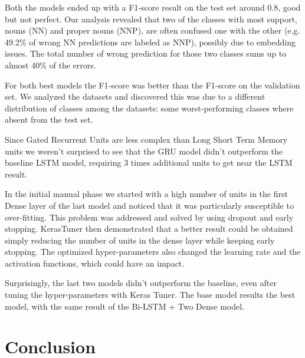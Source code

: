 \documentclass[11pt]{article}
\begin{document}

Both the models ended up with a F1-score result on the test set around 0.8, good but not perfect. Our analysis revealed that two of the classes with most support, nouns (NN) and proper nouns (NNP), are often confused one with the other (e.g. 49.2\% of wrong NN predictions are labeled as NNP), possibly due to embedding issues. The total number of wrong prediction for those two classes sums up to almost 40\% of the errors.

For both best models the F1-score was better than the F1-score on the validation set.
We analyzed the datasets and discovered this was due to a different distribution of classes among the datasets: some worst-performing classes where absent from the test set.

Since Gated Recurrent Units are less complex than Long Short Term Memory units we weren't surprised to see that the GRU model didn't outperform the baseline LSTM model, requiring 3 times additional units to get near the LSTM result.

In the initial manual phase we started with a high number of units in the first Dense layer of the last model and noticed that it was particularly susceptible to over-fitting. This problem was addressed and solved by using dropout and early stopping.
KerasTuner then demonstrated that a better result could be obtained simply reducing the number of units in the dense layer while keeping early stopping. The optimized hyper-parameters also changed the learning rate and the activation functions, which could have an impact.

Surprisingly, the last two models didn't outperform the baseline, even after tuning the hyper-parameters with Keras Tuner. The base model results the best model, with the same result of the Bi-LSTM + Two Dense model.

\section{Conclusion}
\label{sec:conclusion}
\end{document}

